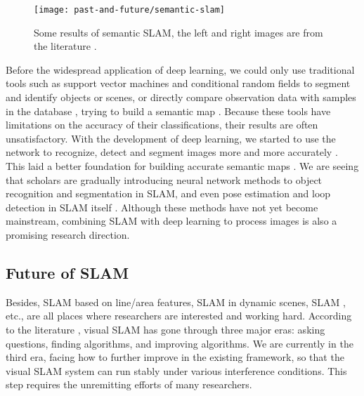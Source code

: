 \begin{figure}[! thp]
\centering
\texttt{[image: past-and-future/semantic-slam]}
\caption{Some results of semantic SLAM, the left and right images are from the literature \cite{Anand2012, Salas-Moreno2014}. }
\label{fig: semantic-slam}
\end{figure}

Before the widespread application of deep learning, we could only use traditional tools such as support vector machines and conditional random fields to segment and identify objects or scenes, or directly compare observation data with samples in the database \textsuperscript{\cite{Salas- Moreno2013, Salas-Moreno2014}}, trying to build a semantic map \textsuperscript{\cite{Anand2012, Stueckler2012, Kostavelis2013, Couprie2013}}. Because these tools have limitations on the accuracy of their classifications, their results are often unsatisfactory. With the development of deep learning, we started to use the network to recognize, detect and segment images more and more accurately \textsuperscript{\cite{Deng2009, Krizhevsky2012, He2015, Ren2015, Long2014, Zheng2015}}. This laid a better foundation for building accurate semantic maps \textsuperscript{\cite{Gupta2014}}. We are seeing that scholars are gradually introducing neural network methods to object recognition and segmentation in SLAM, and even pose estimation and loop detection in SLAM itself \textsuperscript{\cite{Konda2015, Kendall2015, Hou2015}}. Although these methods have not yet become mainstream, combining SLAM with deep learning to process images is also a promising research direction.

\subsection{Future of SLAM}
Besides, SLAM \textsuperscript{\cite{An2012, Zhou2015, Benedettelli2012}} based on line/area features, SLAM \textsuperscript{\cite{Saarinen2013, Maddern2012, Wang2008}} in dynamic scenes, SLAM \textsuperscript{\cite{Zou2013, Gil2010a, Vidal-Calleja2011}}, etc., are all places where researchers are interested and working hard. According to the literature \cite{Cadena2016}, visual SLAM has gone through three major eras: asking questions, finding algorithms, and improving algorithms. We are currently in the third era, facing how to further improve in the existing framework, so that the visual SLAM system can run stably under various interference conditions. This step requires the unremitting efforts of many researchers.

